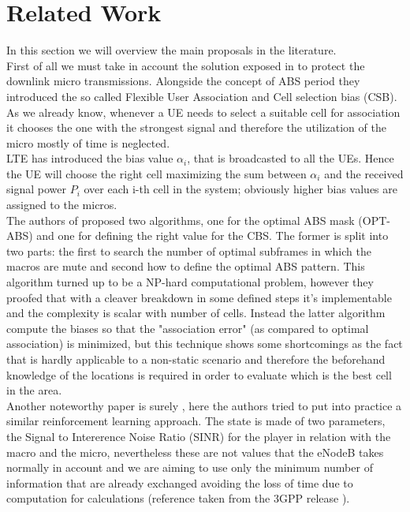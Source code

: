 \documentclass[conference,10pt]{IEEEtran}
\begin{document}
\section{Related Work}\label{sec:sota}
In this section we will overview the main proposals in the literature.\\
First of all we must take in account the solution exposed in \cite{deb2014algorithms} to protect the downlink micro transmissions. Alongside the concept of ABS period they introduced the so called Flexible User Association and Cell selection bias (CSB). As we already know, whenever a UE needs to select a suitable cell for association it chooses the one with the strongest signal and therefore the utilization of the micro mostly of time is neglected.\\
LTE has introduced the bias value $\alpha_i$, that is broadcasted to all the UEs. Hence the UE will choose the right cell maximizing the sum between $\alpha_i$ and the received signal power $P_i$ over each i-th cell in the system; obviously higher bias values are assigned to the micros.\\
The authors of \cite{deb2014algorithms} proposed two algorithms, one for the optimal ABS mask (OPT-ABS) and one for defining the right value for the CBS. The former is split into two parts: the first to search the number of optimal subframes in which the macros are mute and second how to define the optimal ABS pattern. This algorithm turned up to be a NP-hard computational problem, however they proofed that with a cleaver breakdown in some defined steps it's implementable and the complexity is scalar with number of cells. Instead the latter algorithm compute the biases so that the "association error" (as compared to optimal association) is minimized, but this technique shows some shortcomings as the fact that is hardly applicable to a non-static scenario and therefore the beforehand knowledge of the locations is required in order to evaluate which is the best cell in the area.\\
Another noteworthy paper is surely \cite{simsek2013enhanced}, here the authors tried to put into practice a similar reinforcement learning approach. The state is made of two parameters, the Signal to Intererence Noise Ratio (SINR) for the player in relation with the macro and the micro, nevertheless these are not values that the eNodeB takes normally in account and we are aiming to use only the minimum number of information that are already exchanged avoiding the loss of time due to computation for calculations (reference taken from the 3GPP release \cite{etsi2017136}). 
\end{document}
